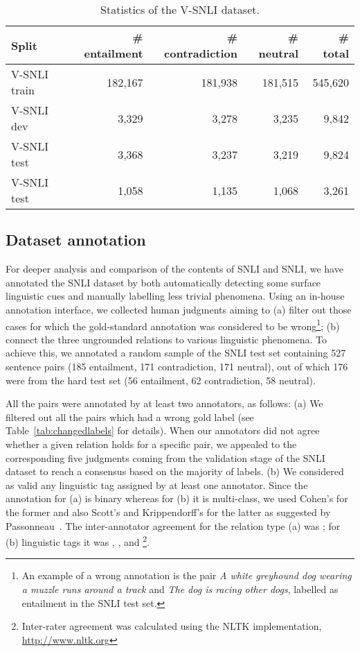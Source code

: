 \documentclass[11pt]{article}
\begin{document}
\begin{table}[!ht]
	\small
    \centering   
    \begin{tabular}{|l|r|r|r|r|}
        \hline
        \textbf{Split} & \textbf{\# entailment} & \textbf{\# contradiction} & \textbf{\# neutral} & \textbf{\# total} \\ \hline
        V-SNLI train & 182,167 & 181,938 & 181,515 & 545,620            \\ \hline
        V-SNLI dev & 3,329 & 3,278 & 3,235 & 9,842              \\ \hline
        V-SNLI test & 3,368 & 3,237 & 3,219 & 9,824              \\ \hline
        V-SNLI test & 1,058 & 1,135 & 1,068 & 3,261\\\hline
    \end{tabular}
     \caption{Statistics of the V-SNLI dataset.}
    \label{table:vsnli}
\end{table}


\subsection{Dataset annotation}
For deeper analysis and comparison of the contents of SNLI and SNLI,
we have annotated the SNLI dataset by both automatically detecting some surface linguistic cues and manually labelling less trivial phenomena.
Using an in-house annotation interface, we collected human judgments aiming to (a) filter out those cases for which the gold-standard annotation was considered to be wrong\footnote{An example of a wrong annotation is the pair \emph{A white greyhound dog wearing a muzzle runs around a track} and \emph{The dog is racing other dogs}, labelled as entailment in the SNLI test set.};
(b) connect the three ungrounded relations to various linguistic phenomena.
To achieve this, we annotated a random sample of the SNLI test set containing 527 sentence pairs (185 entailment, 171 contradiction, 171 neutral),
out of which 176 were from the hard test set (56 entailment, 62 contradiction, 58 neutral).

All the pairs were annotated by at least two annotators, as follows:
(a) We filtered out all the pairs which had a wrong gold label (see Table~\ref{tab:changedlabels} for details).
When our annotators did not agree whether a given relation holds for a specific pair, we appealed to the corresponding five judgments coming from the validation stage of the SNLI dataset to reach a consensus based on the majority of labels. (b) We considered as valid any linguistic tag assigned by at least one annotator.
Since the annotation for (a) is binary whereas for (b) it is
multi-class, we used Cohen's  for the former and also Scott's  and Krippendorff's  for the latter as suggested by Passonneau~.
The inter-annotator agreement for the relation type (a) was ; for (b) linguistic tags it was , , and \footnote{Inter-rater agreement was calculated using the NLTK implementation, \url{http://www.nltk.org}}.
\end{document}
